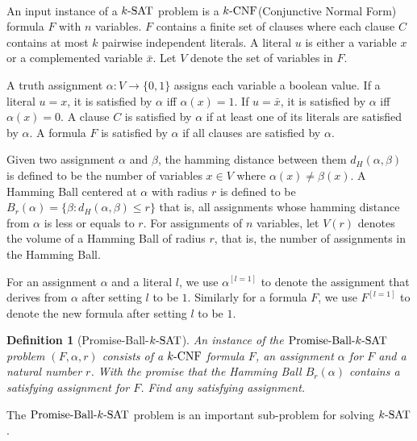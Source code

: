 \documentclass[a4paper,12pts]{article}
\newcommand{\SAT}{\textnormal{$k$-SAT}}
\newcommand{\CNF}{\textnormal{$k$-CNF}}
\newcommand{\dist}[2]{d_H(#1,#2)}
\newcommand{\ball}[2]{B_{#1}(#2)}
\newcommand{\PBS}{\textnormal{Promise-Ball-$\SAT$}}
\newtheorem{definition}{Definition}
\begin{document}
\paragraph{} An input instance of a $\SAT$ problem is a $\CNF$(Conjunctive Normal Form) formula $F$ with $n$ variables. $F$ contains a finite set of clauses where each clause $C$ contains at most $k$ pairwise independent literals. A literal $u$ is either a variable $x$ or a complemented variable $\bar{x}$. Let $V$ denote the set of variables in $F$. \par 
A truth assignment $\alpha: V\rightarrow \{0,1\}$ assigns each variable a boolean value. If a literal $u = x$, it is satisfied by $\alpha$ iff $\alpha(x) = 1$. If $u = \bar{x}$, it is satisfied by $\alpha$ iff $\alpha(x) = 0$. A clause $C$ is satisfied by $\alpha$ if at least one of its literals are satisfied by $\alpha$. A formula $F$ is satisfied by $\alpha$ if all clauses are satisfied by $\alpha$. \par 
Given two assignment $\alpha$ and $\beta$, the hamming distance between them $\dist{\alpha}{\beta}$ is defined to be the number of variables $x \in V$ where $\alpha(x) \neq \beta(x)$. A Hamming Ball centered at $\alpha$ with radius $r$ is defined to be $\ball{r}{\alpha} = \{\beta: \dist{\alpha}{\beta} \leq r\}$ that is, all assignments whose hamming distance from $\alpha$ is less or equals to $r$. For assignments of $n$ variables, let $V(r)$ denotes the volume of a Hamming Ball of radius $r$, that is, the number of assignments in the Hamming Ball.\par 
For an assignment $\alpha$ and a literal $l$, we use $\alpha^{[l = 1]}$ to denote the assignment that derives from $\alpha$ after setting $l$ to be $1$. Similarly for a formula $F$, we use $F^{[l = 1]}$ to denote the new formula after setting $l$ to be $1$. \par 
\begin{definition}[\PBS\cite{Moser11}]
	An instance of the $\PBS$ problem $(F,\alpha,r)$ consists of a $\CNF$ formula $F$, an assignment $\alpha$ for $F$ and a natural number $r$. With the promise that the Hamming Ball $\ball{r}{\alpha}$ contains a satisfying assignment for $F$. Find any satisfying assignment.
\end{definition}
The $\PBS$ problem is an important sub-problem for solving $\SAT$. 
\end{document}
